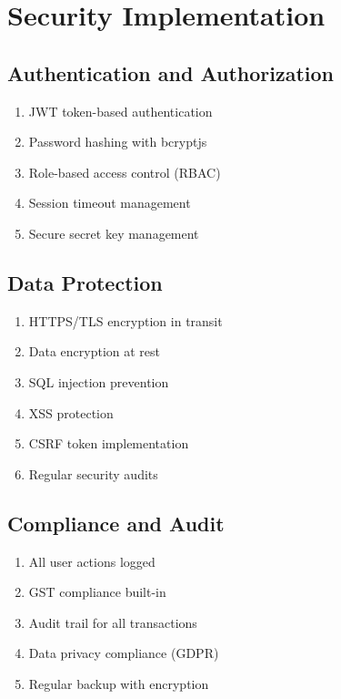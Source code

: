 \documentclass[12pt,a4paper]{report}
\begin{document}
\section{Security Implementation}

\subsection{Authentication and Authorization}

\begin{enumerate}[label=\roman*)]
    \item JWT token-based authentication
    \item Password hashing with bcryptjs
    \item Role-based access control (RBAC)
    \item Session timeout management
    \item Secure secret key management
\end{enumerate}

\subsection{Data Protection}

\begin{enumerate}[label=\roman*)]
    \item HTTPS/TLS encryption in transit
    \item Data encryption at rest
    \item SQL injection prevention
    \item XSS protection
    \item CSRF token implementation
    \item Regular security audits
\end{enumerate}

\subsection{Compliance and Audit}

\begin{enumerate}[label=\roman*)]
    \item All user actions logged
    \item GST compliance built-in
    \item Audit trail for all transactions
    \item Data privacy compliance (GDPR)
    \item Regular backup with encryption
\end{enumerate}
\end{document}
